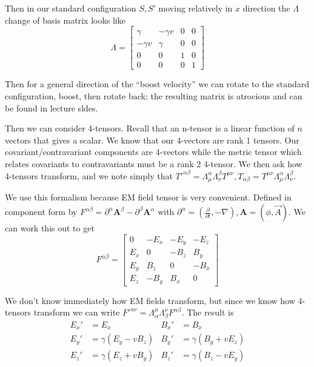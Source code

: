 \documentclass[10pt]{report}
\newcommand{\pd}[2]{\frac{\partial #1}{\partial#2}}
\begin{document}
Then in our standard configuration $S,S'$ moving relatively in $x$ direction the $\Lambda$ change of basis matrix looks like
\begin{equation}
    \Lambda = \begin{bmatrix} \gamma & -\gamma v & 0 & 0\\-\gamma v & \gamma & 0 & 0\\0 & 0 & 1 & 0\\0 & 0 & 0 & 1 \end{bmatrix} 
    \label{1.16.changeBasis}
\end{equation}

Then for a general direction of the ``boost velocity'' we can rotate to the standard configuration, boost, then rotate back; the resulting matrix is atrocious and can be found in lecture sldes. 

Then we can consider 4-tensors. Recall that an n-tensor is a linear function of $n$ vectors that gives a scalar. We know that our 4-vectors are rank 1 tensors. Our covariant/contravariant components are 4-vectors while the metric tensor which relates covariants to contravariants must be a rank 2 4-tensor. We then ask how 4-tensors transform, and we note simply that $T'^{\alpha\beta} = \Lambda_\mu^\alpha \Lambda_\nu^\beta T^{\mu\nu}, T_{\alpha\beta} = T^{\mu\nu}\Lambda_\mu^\alpha \Lambda_\nu^\beta$.

We use this formalism because EM field tensor is very convenient. Defined in component form by $F^{\alpha\beta} = \partial^\alpha \mathbf{A}^\beta - \partial^\beta \mathbf{A}^\alpha$ with $\partial^\alpha = \left( \pd{}{t}, -\nabla \right), \mathbf{A} = (\phi, \vec{A})$. We can work this out to get
\begin{equation}
    F^{\alpha\beta} = \begin{bmatrix} 0 & -E_x & -E_y & -E_z\\
    E_x & 0 & -B_z & B_y\\
E_y & B_z & 0 & -B_x\\
E_z & -B_y & B_x & 0\end{bmatrix} 
    \label{1.16.emtensor}
\end{equation}

We don't know immediately how EM fields transform, but since we know how 4-tensors transform we can write $F'^{uv} = \Lambda_\alpha^\mu \Lambda_\beta^\nu F^{\alpha\beta}$. The result is 
\begin{align}
    E_x' &= E_x & B_x' &= B_x\\
    E_y' &= \gamma(E_y - vB_z) & B_y' &= \gamma(B_y + vE_z)\\
    E_z' &= \gamma(E_z + vB_y) & B_z' &= \gamma(B_z - vE_y)
    \label{1.16.emtransform}
\end{align}
\end{document}
